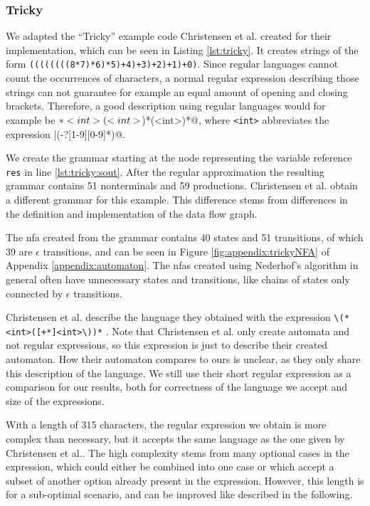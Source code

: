 \subsubsection{Tricky}\label{sec:eval:quality:tricky}

We adapted the \enquote{Tricky} example code Christensen et al. \cite{brics} created for their implementation, which can be seen in Listing \ref{lst:tricky}. It creates strings of the form \lstinline|((((((((8*7)*6)*5)+4)+3)+2)+1)+0)|. Since regular languages cannot count the occurrences of characters, a normal regular expression describing those strings can not guarantee for example an equal amount of opening and closing brackets. Therefore, a good description using regular languages would for example be \Verb@\(*<int>(\*<int>\))*(\+<int>\))*@, where \Verb|<int>| abbreviates the expression |(-?[1-9][0-9]*)@.

We create the grammar starting at the node representing the variable reference \lstinline|res| in line \ref{lst:tricky:sout}.
After the regular approximation the resulting grammar contains 51 nonterminals and 59 productions.
Christensen et al. obtain a different grammar for this example. This difference stems from differences in the definition and implementation of the data flow graph.

The \ac{nfa} created from the grammar contains 40 states and 51 transitions, of which 39 are $\epsilon$ transitions, and can be seen in Figure \ref{fig:appendix:trickyNFA} of Appendix \ref{appendix:automaton}.
The \acp{nfa} created using Nederhof's algorithm in general often have unnecessary states and transitions, like chains of states only connected by $\epsilon$ transitions.

Christensen et al. describe the language they obtained with the expression \Verb|\(*<int>([+*]<int>\))*| \cite{brics}. Note that Christensen et al. only create automata and not regular expressions, so this expression is just to describe their created automaton. How their automaton compares to ours is unclear, as they only share this description of the language. We still use  their short regular expression as a comparison for our results, both for correctness of the language we accept and size of the expressions.

With a length of 315 characters, the regular expression we obtain is more complex than necessary, but it accepts the same language as the one given by Christensen et al.. 
The high complexity stems from many optional cases in the expression, which could either be combined into one case or which accept a subset of another option already present in the expression.
However, this length is for a sub-optimal scenario, and can be improved like described in the following.

